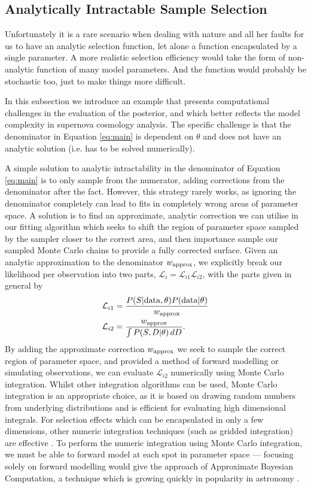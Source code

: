 \documentclass[a4paper,fleqn,usenatbib]{mnras}
\begin{document}
\subsection{Analytically Intractable Sample Selection}
\label{sec:real}
Unfortunately it is a rare scenario when dealing with nature and all her faults for us to have an analytic selection function, let alone a function encapsulated by a single parameter. A more realistic selection efficiency would take the form of non-analytic function of many model parameters. And the function would probably be stochastic too, just to make things more difficult. 

In this subsection we introduce an example that presents computational challenges in the evaluation of the posterior, and which better reflects the model complexity in supernova cosmology analysis. The specific challenge is that the denominator in Equation \eqref{eq:main} is dependent on $\theta$ and does not have an analytic solution (i.e. has to be solved numerically). 


A simple solution to analytic intractability in the denominator of Equation \eqref{eq:main} is to only sample from the numerator, adding corrections from the denominator after the fact. However, this strategy rarely works, as ignoring the denominator completely can lead to fits in completely wrong areas of parameter space. A solution is to find an approximate, analytic correction we can utilise in our fitting algorithm which seeks to shift the region of parameter space sampled by the sampler closer to the correct area, and then importance sample our sampled Monte Carlo chains to provide a fully corrected surface. Given an analytic approximation to the denominator $w_{\rm approx}$, we explicitly break our likelihood per observation into two parts, $\mathcal{L}_i = \mathcal{L}_{i1} \mathcal{L}_{i2}$, with the parts given in general by
\begin{align}
\mathcal{L}_{i1} &= \frac{P(S|{\rm data},\theta) P({\rm data}|\theta)}{w_{\rm approx}} \\
\mathcal{L}_{i2} &= \frac{w_{\rm approx}}{\int P(S, D|\theta)\, dD}.
\end{align}
By adding the approximate correction $w_{\rm approx}$ we seek to sample the correct region of parameter space, and provided a method of forward modelling or simulating observations, we can evaluate $\mathcal{L}_{i2}$ numerically using Monte Carlo integration. Whilst other integration algorithms can be used, Monte Carlo integration is an appropriate choice, as it is based on drawing random numbers from underlying distributions and is efficient for evaluating high dimensional integrals. For selection effects which can be encapsulated in only a few dimensions, other numeric integration techniques (such as gridded integration) are effective \citep{BuchnerGeorgakakis2015}. To perform the numeric integration using Monte Carlo integration, we must be able to forward model at each spot in parameter space --- focusing solely on forward modelling would give the approach of Approximate Bayesian Computation, a technique which is growing quickly in popularity in astronomy \citep{CameronPettitt2012, JenningsMadigan2017}.
\end{document}
